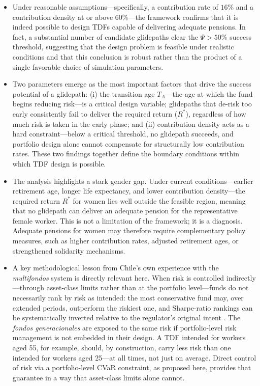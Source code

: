 \documentclass[11pt]{article}
\begin{document}
\begin{itemize}

\item Under reasonable assumptions---specifically, a contribution 
rate of $16\%$ and a contribution density at or above $60\%$---the 
framework confirms that it is indeed possible to design TDFs capable 
of delivering adequate pensions. In fact, a substantial number of 
candidate glidepaths clear the $\Psi > 50\%$ success threshold, 
suggesting that the design problem is feasible under realistic 
conditions and that this conclusion is robust rather than the product 
of a single favorable choice of simulation parameters.

\item Two parameters emerge as the most important factors that drive the success potential of a glidepath:  (i) the transition age $T_A$---the age at which the fund 
begins reducing risk---is a critical design variable; glidepaths that de-risk too early consistently fail to deliver the required return ($R^*$), 
regardless of how much risk is taken in the early phase; and (ii) contribution 
density acts as a hard constraint---below a critical threshold, no 
glidepath succeeds, and portfolio design alone cannot compensate for 
structurally low contribution rates. These two findings together 
define the boundary conditions within which TDF design is possible.



\item The analysis highlights a stark gender gap. Under current 
conditions---earlier retirement age, longer life expectancy, and 
lower contribution density---the required return $R^*$ for women 
lies well outside the feasible region, meaning that no glidepath 
can deliver an adequate pension for the representative female worker. 
This is not a limitation of the framework; it is a diagnosis. 
Adequate pensions for women may therefore require complementary policy measures, such as higher contribution rates, adjusted 
retirement ages, or strengthened solidarity mechanisms.

\item A key methodological lesson from Chile's own experience with 
the \textit{multifondos} system is directly relevant here. When risk 
is controlled indirectly---through asset-class limits rather than 
at the portfolio level---funds do not necessarily rank by risk 
as intended: the most conservative fund may, over extended periods, 
outperform the riskiest one, and Sharpe-ratio rankings can be 
systematically inverted relative to the regulator's original intent 
\cite{schlechter2019,pagnoncelli2023}. The \textit{fondos 
generacionales} are exposed to the same risk if portfolio-level 
risk management is not embedded in their design. A TDF intended 
for workers aged 55, for example, should, by construction, carry less risk than 
one intended for workers aged 25---at all times, not just on 
average. Direct control of risk via a portfolio-level CVaR 
constraint, as proposed here, provides that guarantee in a way 
that asset-class limits alone cannot.




\end{itemize}
\end{document}
